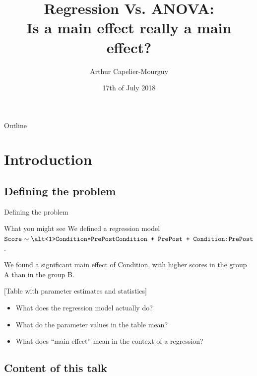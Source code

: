 \documentclass{beamer}
\title[Understandin regression results]{Regression Vs. ANOVA:\\Is a main effect really a main effect?}
\author[A. Capelier-Mourguy]{Arthur Capelier-Mourguy}
\institute{Lancaster University}
\date{17th of July 2018}
\begin{document}
\begin{frame}
  \titlepage
\end{frame}

\begin{frame}{Outline}
  \tableofcontents
\end{frame}

\section{Introduction}

\subsection{Defining the problem}

\begin{frame}{Defining the problem}

  \begin{exampleblock}{What you might see}
  We defined a regression model $\texttt{Score} \sim \texttt{\alt<1>{Condition*PrePost}{Condition + PrePost + Condition:PrePost}}$.\pause
  
  \pause
  We found a significant main effect of Condition, with higher scores in the group A than in the group B.
  
  \pause
  $[$Table with parameter estimates and statistics$]$
  \end{exampleblock}
  \vspace{1em}
  \pause
  \begin{itemize}
    \item What does the regression model actually do?
    \item What do the parameter values in the table mean?
    \item What does ``main effect'' mean in the context of a regression?
  \end{itemize}
  \vspace{1em}
  \pause

\end{frame}

\subsection{Content of this talk}
\end{document}
